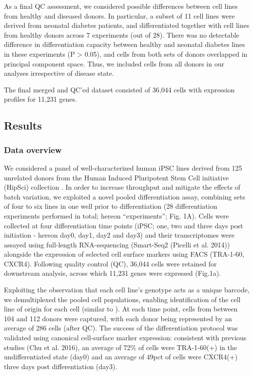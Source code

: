 As a final QC assessment, we considered possible differences between cell lines from healthy and diseased donors. 
In particular, a subset of 11 cell lines were derived from neonatal diabetes patients, and differentiated together with cell lines from healthy donors across 7 experiments (out of 28). There was no detectable difference in differentiation capacity between healthy and neonatal diabetes lines in these experiments (P > 0.05), and cells from both sets of donors overlapped in principal component space. 
Thus, we included cells from all donors in our analyses irrespective of disease state.

The final merged and QC’ed dataset consisted of 36,044 cells with expression profiles for 11,231 genes.


\subsection{Results}

\subsubsection{Data overview}

 We considered a panel of well-characterized human iPSC lines derived from 125 unrelated donors from the Human Induced Pluripotent Stem Cell initiative (HipSci) collection \cite{kilpinen2017common}. 
 In order to increase throughput and mitigate the effects of batch variation, we exploited a novel pooled differentiation assay, combining sets of four to six lines in one well prior to differentiation (28 differentiation experiments performed in total; hereon “experiments”; Fig. 1A). 
 Cells were collected at four differentiation time points (iPSC; one, two and three days post initiation - hereon day0, day1, day2 and day3) and their transcriptomes were assayed using full-length RNA-sequencing (Smart-Seq2 (Picelli et al. 2014)) alongside the expression of selected cell surface markers using FACS (TRA-1-60, CXCR4). 
 Following quality control (QC), 36,044 cells were retained for downstream analysis, across which 11,231 genes were expressed (Fig.1a).
 
 Exploiting the observation that each cell line’s genotype acts as a unique barcode, we demultiplexed the pooled cell populations, enabling identification of the cell line of origin for each cell (similar to \cite{kang2018multiplexed}). 
 At each time point, cells from between 104 and 112 donors were captured, with each donor being represented by an average of 286 cells (after QC). 
 The success of the differentiation protocol was validated using canonical cell-surface marker expression: consistent with previous studies (Chu et al. 2016), an average of 72\% of cells were TRA-1-60(+) in the undifferentiated state (day0) and an average of 49pct of cells were CXCR4(+) three days post differentiation (day3).

